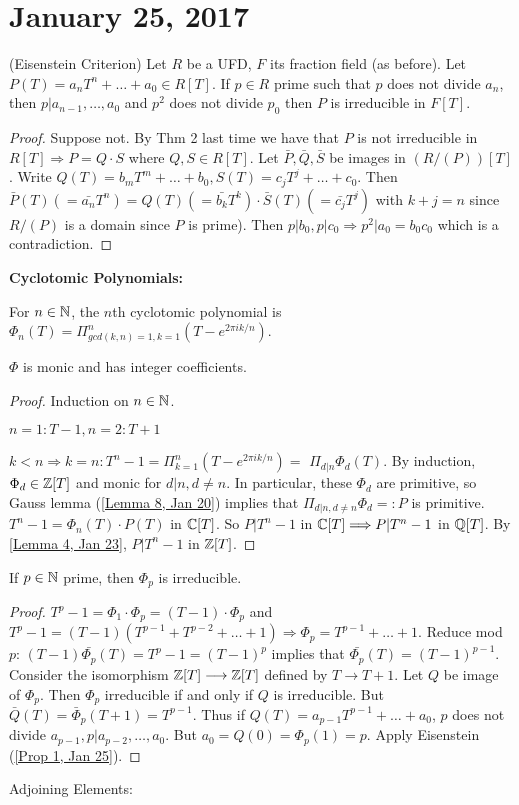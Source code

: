 \section{January 25, 2017}

\begin{prop} \label{Prop 1, Jan 25}
(Eisenstein Criterion) Let $R$ be a UFD, $F$ its fraction field (as before). Let $P(T)=a_nT^n+\ldots+a_0\in R[T]$. If $p\in R$ prime such that $p$ does not divide $a_n$, then $p|a_{n-1},\ldots,a_0$ and $p^2$ does not divide $p_0$ then $P$ is irreducible in $F[T]$.
\end{prop}
\begin{proof}
Suppose not. By Thm 2 last time we have that $P$ is not irreducible in $R[T]\Longrightarrow P=Q\cdot S$ where $Q,S\in R[T].$ Let $\bar{P},\bar{Q},\bar{S}$ be images in $(R/(P))[T]$. Write $Q(T)=b_mT^m+\ldots+b_0, S(T)=c_jT^j+\ldots+c_0$. Then $\bar{P}(T)(=\bar{a_n}T^n)=Q(T)(=\bar{b_k}T^k)\cdot \bar{S}(T)(=\bar{c_j}T^j)$ with $k+j=n$ since $R/(P)$ is a domain since $P$ is prime). Then $p|b_0,p|c_0\Longrightarrow p^2|a_0=b_0c_0$ which is a contradiction.
\end{proof}
\noindent \textbf{Cyclotomic Polynomials:}
\begin{defn} \label{Defn 2, Jan 25}
For $n\in \mathbb{N}$, the $n$th cyclotomic polynomial is $\Phi_n(T)=\Pi_{gcd(k,n)=1,k=1}^n(T-e^{2\pi ik/n})$.
\end{defn}
\begin{prop} \label{Prop 3, Jan 25}
$\Phi$ is monic and has integer coefficients.
\end{prop}
\begin{proof}
Induction on $n\in \mathbb{N}$.

$n=1: T-1,n=2: T+1$

$k<n\Longrightarrow k=n:T^n-1=\Pi_{k=1}^n(T-e^{2\pi ik/n})=$
$\Pi_{d|n}\Phi_d(T)$. By induction, $\Phi_d\in \mathbb{Z}[T]$ and monic for $d|n, d\ne n$. In particular, these $\Phi_d$ are primitive, so Gauss lemma (\ref{Lemma 8, Jan 20}) implies that $\Pi_{d|n,d\ne n}\Phi_d=:P$ is primitive. $T^n-1=\Phi_n(T)\cdot P(T)$ in $\mathbb{C}[T]$. So $P|T^n-1$ in $\mathbb{C}[T]\Longrightarrow P|T^n-1$ in $\mathbb{Q}[T]$. By \ref{Lemma 4, Jan 23}, $P|T^n-1$ in $\mathbb{Z}[T]$.
\end{proof}
\begin{prop} \label{Prop 4, Jan 25}
If $p\in \mathbb{N}$ prime, then $\Phi_p$ is irreducible.
\end{prop}
\begin{proof}
$T^p-1=\Phi_1\cdot \Phi_p=(T-1)\cdot\Phi_p$ and $T^p-1=(T-1)(T^{p-1}+T^{p-2}+\ldots+1)\Longrightarrow \Phi_p=T^{p-1}+\ldots+1.$ Reduce mod $p$: $(T-1)\bar{\Phi_p}(T)=T^p-1=(T-1)^p$ implies that $\bar{\Phi_p}(T)=(T-1)^{p-1}$. Consider the isomorphism $\mathbb{Z}[T]\longrightarrow \mathbb{Z}[T]$ defined by $T\longrightarrow T+1$. Let $Q$ be image of $\Phi_p$. Then $\Phi_p$ irreducible if and only if $Q$ is irreducible. But $\bar{Q}(T)=\bar{\Phi}_p(T+1)=T^{p-1}$. Thus if $Q(T)=a_{p-1}T^{p-1}+\ldots+a_0$, $p$ does not divide $a_{p-1},p|a_{p-2},\ldots,a_0$. But $a_0=Q(0)=\Phi_p(1)=p$. Apply Eisenstein (\ref{Prop 1, Jan 25}).
\end{proof}
Adjoining Elements:

